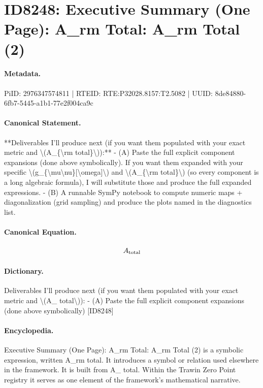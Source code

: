 \section*{ID8248: Executive Summary (One Page): A\_rm Total: A\_rm Total (2)}
\paragraph{Metadata.}
PiID: 2976347574811 | RTEID: RTE:P32028.8157:T2.5082 | UUID: 8de84880-6fb7-5445-a1b1-77e2f004ca9c

\paragraph{Canonical Statement.}
**Deliverables I’ll produce next (if you want them populated with your exact metric and \textbackslash{}(A\_\{\textbackslash{}rm total\}\textbackslash{})):** - (A) Paste the full explicit component expansions (done above symbolically). If you want them expanded with your specific \textbackslash{}(g\_\{\textbackslash{}mu\textbackslash{}nu\}[\textbackslash{}omega]\textbackslash{}) and \textbackslash{}(A\_\{\textbackslash{}rm total\}\textbackslash{}) (so every component is a long algebraic formula), I will substitute those and produce the full expanded expressions. - (B) A runnable SymPy notebook to compute numeric maps + diagonalization (grid sampling) and produce the plots named in the diagnostics list.

\paragraph{Canonical Equation.}
\[
A_{\rm total}
\]

\paragraph{Dictionary.}
Deliverables I’ll produce next (if you want them populated with your exact metric and \textbackslash{}(A\_ total\textbackslash{})): - (A) Paste the full explicit component expansions (done above symbolically) [ID8248]

\paragraph{Encyclopedia.}
Executive Summary (One Page): A\_rm Total: A\_rm Total (2) is a symbolic expression, written A\_rm total. It introduces a symbol or relation used elsewhere in the framework. It is built from A\_ total. Within the Trawin Zero Point registry it serves as one element of the framework's mathematical narrative.
